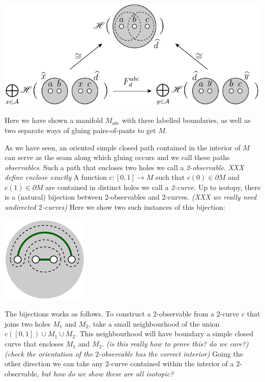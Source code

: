 \documentclass[aps, prl, letterpaper, twocolumn, superscriptaddress, notitlepage, 10pt]{revtex4-1}
\begin{document}
\begin{center}
\includegraphics[]{pic-glue-fmove.pdf}
\end{center}

Here we have shown a manifold $M_{abc}$ with 
three labelled boundaries, as well as two separate
ways of gluing pairs-of-pants to get $M.$

As we have seen, an oriented simple closed path 
contained in the interior of $M$ can serve as
the seam along which gluing occurs and we call
these paths \emph{observables}.
Such a path that encloses two holes
we call a \emph{2-observable}.
\emph{XXX define enclose exactly}
A function $c:[0,1]\to M$ such that 
$c(0)\in \partial M$ and $c(1)\in \partial M$
are contained in distinct holes
we call a \emph{2-curve.}
Up to isotopy, %
there is a (natural) bijection between
$2$-observables and $2$-curves.
\emph{(XXX we really need undirected $2$-curves)}
Here we show two such instances of this
bijection:
\begin{center}
\includegraphics[]{pic-2-curve.pdf}
\end{center}
The bijections works as follows.
To construct a $2$-observable from a $2$-curve $c$ that
joins two holes $M_1$ and $M_2$,
take a small neighbourhood of
the union $c([0,1])\cup M_1 \cup M_2.$
This neighbourhood will have boundary a simple closed
curve that encloses $M_1$ and $M_2.$
\emph{(is this really how to prove this? do we care?)}
\emph{(check the orientation of the $2$-observable has the correct interior)}
Going the other direction we can take
any $2$-curve contained within the interior of a $2$-observable,
\emph{but how do we show these are all isotopic?}
\end{document}
